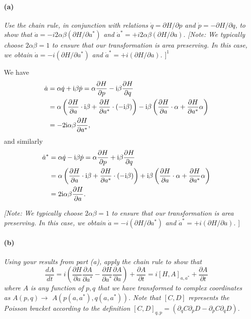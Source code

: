 \documentclass[hyperref, a4paper]{article}
\newcommand*{\ii}{\mathrm{i}}
\begin{document}
\paragraph*{(a)} \textit{
    Use the chain rule, in conjunction with relations $\dot{q}=\partial H / \partial p$ and $\dot{p}=-\partial H / \partial q$, to show that $\dot{a}=-i 2 \alpha \beta\left(\partial H / \partial a^*\right)$ and $\dot{a}^*=+i 2 \alpha \beta(\partial H / \partial a)$.
    [Note: We typically choose $2 \alpha \beta=1$ to ensure that our transformation is area preserving. In this case, we obtain $\dot{a}=-i\left(\partial H / \partial a^*\right)$ and $\dot{a}^*=+i(\partial H / \partial a)$. $]^1$
}

We have 
\begin{equation}
    \begin{aligned}
        \dot{a} &= \alpha \dot{q} + \ii \beta \dot{p} 
        = \alpha \pdv{H}{p} - \ii \beta \pdv{H}{q} \\
        &= \alpha \left( \pdv{H}{a} \cdot \ii \beta + \pdv{H}{a^*} \cdot (- \ii \beta)  \right)
        - \ii \beta \left( \pdv{H}{a} \cdot \alpha + \pdv{H}{a^*} \alpha \right) \\
        &= - 2 \ii \alpha \beta \pdv{H}{a^*}, 
    \end{aligned}
\end{equation}
and similarly 
\begin{equation}
    \begin{aligned}
        \dot{a}^* &= \alpha \dot{q} - \ii \beta \dot{p} 
        = \alpha \pdv{H}{p} + \ii \beta \pdv{H}{q} \\
        &= \alpha \left( \pdv{H}{a} \cdot \ii \beta + \pdv{H}{a^*} \cdot (- \ii \beta)  \right)
        + \ii \beta \left( \pdv{H}{a} \cdot \alpha + \pdv{H}{a^*} \alpha \right) \\
        &= 2 \ii \alpha \beta \pdv{H}{a}.
    \end{aligned}
\end{equation}

\textit{[Note: We typically choose $2 \alpha \beta=1$ to ensure that our transformation is area preserving. In this case, we obtain $\dot{a}=-i\left(\partial H / \partial a^*\right)$ and $\dot{a}^*=+i(\partial H / \partial a)$. $]$}

\paragraph*{(b)} \textit{
     Using your results from part (a), apply the chain rule to show that
$$
\frac{d A}{d t}=i\left(\frac{\partial H}{\partial a} \frac{\partial A}{\partial a^*}-\frac{\partial H}{\partial a^*} \frac{\partial A}{\partial a}\right)+\frac{\partial A}{\partial t}=i[H, A]_{a, a^*}+\frac{\partial A}{\partial t}
$$
where $A$ is any function of $p, q$ that we have transformed to complex coordinates as $A(p, q) \rightarrow$ $A\left(p\left(a, a^*\right), q\left(a, a^*\right)\right)$. Note that $[C, D]$ represents the Poisson bracket according to the definition $[C, D]_{q, p}=\left(\partial_q C \partial_p D-\partial_p C \partial_q D\right)$.
}
\end{document}

